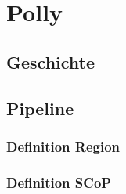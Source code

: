 \chapter{Polly}\label{Polly}
\section{Geschichte}
\section{Pipeline}
\subsection{Definition Region}
\subsection{Definition SCoP}
